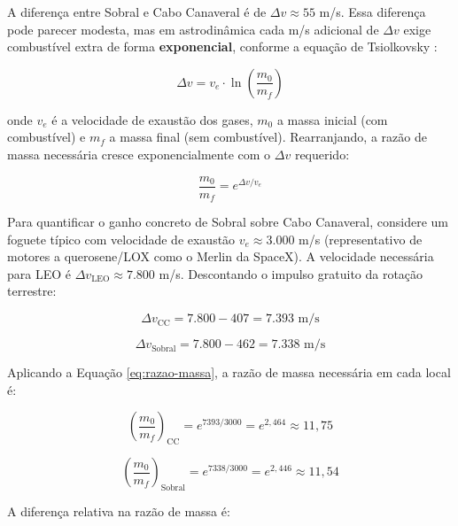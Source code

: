 A diferença entre Sobral e Cabo Canaveral é de $\Delta v \approx 55$ m/s. Essa diferença pode parecer modesta, mas em astrodinâmica cada m/s adicional de $\Delta v$ exige combustível extra de forma \textbf{exponencial}, conforme a equação de Tsiolkovsky \cite{wertz2011}:

\begin{equation}
\label{eq:tsiolkovsky}
\Delta v = v_e \cdot \ln\!\left(\frac{m_0}{m_f}\right)
\end{equation}

\noindent onde $v_e$ é a velocidade de exaustão dos gases, $m_0$ a massa inicial (com combustível) e $m_f$ a massa final (sem combustível). Rearranjando, a razão de massa necessária cresce exponencialmente com o $\Delta v$ requerido:

\begin{equation}
\label{eq:razao-massa}
\frac{m_0}{m_f} = e^{\Delta v / v_e}
\end{equation}

Para quantificar o ganho concreto de Sobral sobre Cabo Canaveral, considere um foguete típico com velocidade de exaustão $v_e \approx 3.000$ m/s (representativo de motores a querosene/LOX como o Merlin da SpaceX). A velocidade necessária para LEO é $\Delta v_{\text{LEO}} \approx 7.800$ m/s. Descontando o impulso gratuito da rotação terrestre:

\begin{equation}
\label{eq:dv-canaveral}
\Delta v_{\text{CC}} = 7.800 - 407 = 7.393 \text{ m/s}
\end{equation}

\begin{equation}
\label{eq:dv-sobral}
\Delta v_{\text{Sobral}} = 7.800 - 462 = 7.338 \text{ m/s}
\end{equation}

\noindent Aplicando a Equação \ref{eq:razao-massa}, a razão de massa necessária em cada local é:

\begin{equation}
\label{eq:razao-cc}
\left(\frac{m_0}{m_f}\right)_{\text{CC}} = e^{7393/3000} = e^{2{,}464} \approx 11{,}75
\end{equation}

\begin{equation}
\label{eq:razao-sobral}
\left(\frac{m_0}{m_f}\right)_{\text{Sobral}} = e^{7338/3000} = e^{2{,}446} \approx 11{,}54
\end{equation}

\noindent A diferença relativa na razão de massa é:

